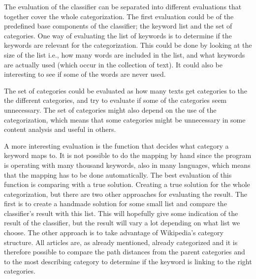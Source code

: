 

The evaluation of the classifier can be separated into different evaluations that together cover the whole categorization. 
The first evaluation could be of the predefined base components of the classifier; the keyword list and the set of categories. One way of evaluating the list of keywords is to determine if the keywords are relevant for the categorization. This could be done by looking at the size of the list i.e., how many words are included in the list, and what keywords are actually used (which occur in the collection of text). It could also be interesting to see if some of the words are never used. 

The set of categories could be evaluated as how many texts get categories to the the different categories, and try to evaluate if some of the categories seem unnecessary. The set of categories might also depend on the use of the categorization, which means that some categories might be unnecessary in some content analysis and useful in others. 

A more interesting evaluation is the function that decides what category a keyword maps to. It is not possible to do the mapping by hand since the program is operating with many thousand keywords, also in many languages, which means that the mapping has to be done automatically. The best evaluation of this function is comparing with  a true solution. Creating a true solution for the whole categorization, but there are two other approaches for evaluating the result. The first is to create a handmade solution for some small list and compare the classifier's result with this list. This will hopefully give some indication of the result of the classifier, but the result will vary a lot depending on what list we choose. 
The other approach is to take advantage of Wikipedia's category structure. 
%
All articles are, as already mentioned, already categorized and it is therefore possible to compare the path 
distances from the parent categories and to the most describing category to determine if the keyword is linking to the right categories.


